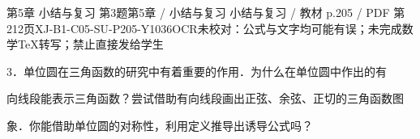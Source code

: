 \begin{bankitem}{第5章 小结与复习 第3题}{第5章 / 小结与复习 小结与复习 / 教材 p.205 / PDF 第212页}{XJ-B1-C05-SU-P205-Y1036}{OCR未校对：公式与文字均可能有误；未完成数学TeX转写；禁止直接发给学生}
\begin{ocrdraft}
\par
3．单位圆在三角函数的研究中有着重要的作用．为什么在单位圆中作出的有
\par
向线段能表示三角函数？尝试借助有向线段画出正弦、余弦、正切的三角函数图
\par
象．你能借助单位圆的对称性，利用定义推导出诱导公式吗？
\end{ocrdraft}
\end{bankitem}
